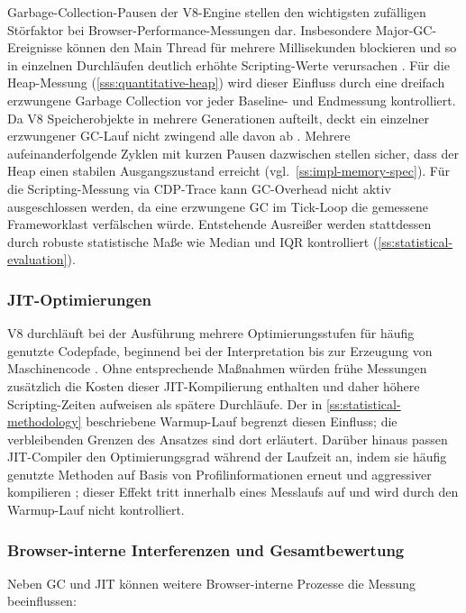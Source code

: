 Garbage-Collection-Pausen der V8-Engine stellen den wichtigsten zufälligen Störfaktor bei Browser-Performance-Messungen dar. Insbesondere Major-GC-Ereignisse können den Main Thread für mehrere Millisekunden blockieren und so in einzelnen Durchläufen deutlich erhöhte Scripting-Werte verursachen \cite{v8.dev_fiber-2019}. Für die Heap-Messung (\cref{sss:quantitative-heap}) wird dieser Einfluss durch eine dreifach erzwungene Garbage Collection vor jeder Baseline- und Endmessung kontrolliert. Da V8 Speicherobjekte in mehrere Generationen aufteilt, deckt ein einzelner erzwungener GC-Lauf nicht zwingend alle davon ab \cite{v8.dev_fiber-2019}. Mehrere aufeinanderfolgende Zyklen mit kurzen Pausen dazwischen stellen sicher, dass der Heap einen stabilen Ausgangszustand erreicht (vgl.~\cref{ss:impl-memory-spec}). Für die Scripting-Messung via CDP-Trace kann GC-Overhead nicht aktiv ausgeschlossen werden, da eine erzwungene GC im Tick-Loop die gemessene Frameworklast verfälschen würde. Entstehende Ausreißer werden stattdessen durch robuste statistische Maße wie Median und IQR kontrolliert (\cref{ss:statistical-evaluation}).

\subsubsection{JIT-Optimierungen}
\label{sss:jit-interference}

V8 durchläuft bei der Ausführung mehrere Optimierungsstufen für häufig genutzte Codepfade, beginnend bei der Interpretation bis zur Erzeugung von Maschinencode \cite{v8.dev_fiber-2019}. Ohne entsprechende Maßnahmen würden frühe Messungen zusätzlich die Kosten dieser JIT-Kompilierung enthalten und daher höhere Scripting-Zeiten aufweisen als spätere Durchläufe. Der in \cref{ss:statistical-methodology} beschriebene Warmup-Lauf begrenzt diesen Einfluss; die verbleibenden Grenzen des Ansatzes sind dort erläutert. Darüber hinaus passen JIT-Compiler den Optimierungsgrad während der Laufzeit an, indem sie häufig genutzte Methoden auf Basis von Profilinformationen erneut und aggressiver kompilieren \cite{ibm-jit-compiler-2024}; dieser Effekt tritt innerhalb eines Messlaufs auf und wird durch den Warmup-Lauf nicht kontrolliert.

\subsubsection{Browser-interne Interferenzen und Gesamtbewertung}
\label{sss:disturbances}

Neben GC und JIT können weitere Browser-interne Prozesse die Messung beeinflussen:

